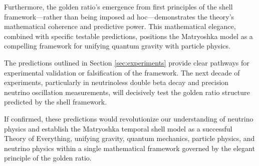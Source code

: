 \documentclass[12pt,a4paper]{article}
\begin{document}
    Furthermore, the golden ratio's emergence from first principles of the shell framework—rather than being imposed ad hoc—demonstrates the theory's mathematical coherence and predictive power. This mathematical elegance, combined with specific testable predictions, positions the Matryoshka model as a compelling framework for unifying quantum gravity with particle physics.
    
    The predictions outlined in Section \ref{sec:experiments} provide clear pathways for experimental validation or falsification of the framework. The next decade of experiments, particularly in neutrinoless double beta decay and precision neutrino oscillation measurements, will decisively test the golden ratio structure predicted by the shell framework.
    
    If confirmed, these predictions would revolutionize our understanding of neutrino physics and establish the Matryoshka temporal shell model as a successful Theory of Everything, unifying gravity, quantum mechanics, particle physics, and neutrino physics within a single mathematical framework governed by the elegant principle of the golden ratio.
    
    
    
    
    
\end{document}
